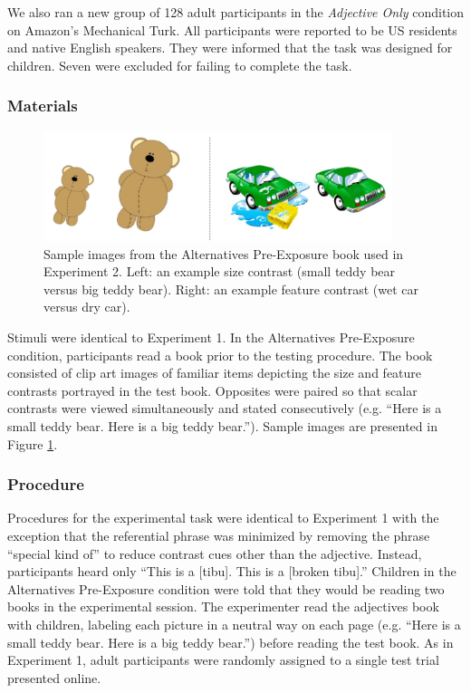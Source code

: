 \documentclass[man]{apa2}
\begin{document}
We also ran a new group of 128 adult participants in the \emph{Adjective Only} condition on Amazon's Mechanical Turk.  All participants were reported to be US residents and native English speakers.  They were informed that the task was designed for children.  Seven were excluded for failing to complete the task. 

\subsubsection{Materials}

\begin{figure}[t] 
  \begin{center} 
    \includegraphics[width=4in]{figures/aliens_book_demo_mod.png} 
    \caption{\label{fig:book_demo} Sample images from the Alternatives Pre-Exposure book used in Experiment 2. Left: an example size contrast (small teddy bear versus big teddy bear). Right: an example feature contrast (wet car versus dry car). }
  \end{center} 
\end{figure}

Stimuli were identical to Experiment 1. In the Alternatives Pre-Exposure condition, participants read a book prior to the testing procedure.  The book consisted of clip art images of familiar items depicting the size and feature contrasts portrayed in the test book. Opposites were paired so that scalar contrasts were viewed simultaneously and stated consecutively (e.g. ``Here is a small teddy bear.  Here is a big teddy bear.'').  Sample images are presented in Figure \ref{fig:book_demo}.


\subsubsection{Procedure}

Procedures for the experimental task were identical to Experiment 1 with the exception that the referential phrase was minimized by removing the phrase ``special kind of'' to reduce contrast cues other than the adjective.  Instead, participants heard only ``This is a [tibu]. This is a [broken tibu].''  Children in the Alternatives Pre-Exposure condition were told that they would be reading two books in the experimental session. The experimenter read the adjectives book with children, labeling each picture in a neutral way on each page (e.g. ``Here is a small teddy bear. Here is a big teddy bear.'') before reading the test book. As in Experiment 1, adult participants were randomly assigned to a single test trial presented online.  
\end{document}
